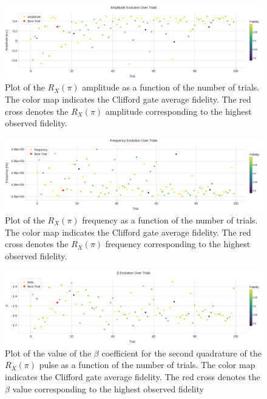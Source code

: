 \begin{figure}[h!]
    \centering
    \includegraphics[width=\textwidth]{figures/png/RB_optimization/Optuna/100/amplitude.png}
    \caption{Plot of the $R_X(\pi)$ amplitude as a function of the number of trials.
    The color map indicates the Clifford gate average fidelity.
    The red cross denotes the $R_X(\pi)$ amplitude corresponding to the highest observed fidelity.}
    \label{fig:optuna100:amplitude}
\end{figure}

\begin{figure}[h!]
    \centering
    \includegraphics[width=\textwidth]{figures/png/RB_optimization/Optuna/100/frequency.png}
    \caption{Plot of the $R_X(\pi)$ frequency as a function of the number of trials. 
    The color map indicates the Clifford gate average fidelity.  
    The red cross denotes the $R_X(\pi)$ frequency corresponding to the highest observed fidelity.}
    \label{fig:optuna100:frequency}
\end{figure}

\begin{figure}[h!]
    \centering
    \includegraphics[width=\textwidth]{figures/png/RB_optimization/Optuna/100/beta.png}
    \caption{Plot of the value of the $\beta$ coefficient for the second quadrature of the $R_X(\pi)$ pulse as a function of the number of trials. 
    The color map indicates the Clifford gate average fidelity.  
    The red cross denotes the $\beta$ value corresponding to the highest observed fidelity}
    \label{fig:optuna100:beta}
\end{figure}

